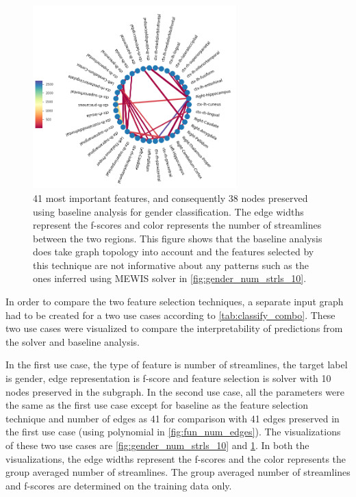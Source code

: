 \documentclass[msthesis.tex]{subfiles}
\begin{document}
\begin{figure}
    \centering
    \includegraphics[width=0.7\textwidth]{images/baseline_42f_10nodes.png}
    \caption{41 most important features, and consequently 38 nodes preserved using baseline analysis for gender classification. The edge widths represent the f-scores and color represents the number of streamlines between the two regions. This figure shows that the baseline analysis does take graph topology into account and the features selected by this technique are not informative about any patterns such as the ones inferred using  MEWIS solver in \cref{fig:gender_num_strls_10}.}
    \label{fig:baseline_num_strls_10}
\end{figure}

In order to compare the two feature selection techniques, a separate input graph had to be created for a two use cases according to \autoref{tab:classify_combo}. These two use cases were visualized to compare the interpretability of predictions from the solver and baseline analysis.

In the first use case, the type of feature is number of streamlines, the target label is gender, edge representation is f-score and feature selection is solver with 10 nodes preserved in the subgraph. In the second use case, all the parameters were the same as the first use case except for baseline as the feature selection technique and number of edges as 41 for comparison with 41 edges preserved in the first use case (using polynomial in \cref{fig:fun_num_edges}).  The visualizations of these two use cases are \cref{fig:gender_num_strls_10} and \cref{fig:baseline_num_strls_10}. In both the visualizations, the edge widths represent the f-scores and the color represents the group averaged number of streamlines. The group averaged number of streamlines and f-scores are determined on the training data only. 
\end{document}

